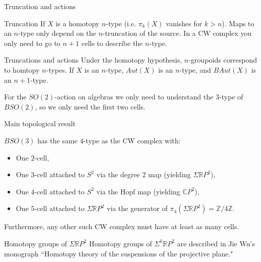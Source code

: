 \documentclass[beamer]{beamer}
\begin{document}
\begin{frame}{Truncation and actions}
\begin{block}{Truncation}
If $X$ is a homotopy $n$-type (i.e. $\pi_k(X)$ vanishes for $k > n$).  Maps to an $n$-type only depend on the $n$-truncation of the source.  In a CW complex you only need to go to $n+1$ cells to describe the $n$-type.
\end{block}

\begin{block}{Truncations and actions}
Under the homotopy hypothesis, $n$-groupoids correspond to homtopy $n$-types.  If $X$ is an $n$-type,  $Aut(X)$ is an $n$-type, and $BAut(X)$ is an $n+1$-type.  
\end{block}

\begin{example}
For the $SO(2)$-action on algebras we only need to understand the $3$-type of $BSO(2)$, so we only need the first two cells.
\end{example}

\end{frame}

\begin{frame}{Main topological result}
\begin{theorem}[DSPS]
$BSO(3)$ has the same $4$-type as the CW complex with:
\begin{itemize}
\item One $2$-cell,
\item One $3$-cell attached to $S^2$ via the degree $2$ map (yielding $\Sigma \mathbb{R}P^2$),
\item One $4$-cell attached to $S^2$ via the Hopf map (yielding $\mathbb{C}P^2$),
\item One $5$-cell attached to $\Sigma \mathbb{R}P^2$ via the generator of $\pi_4(\Sigma \mathbb{R}P^2) = \mathbb{Z}/4\mathbb{Z}$.
\end{itemize}
Furthermore, any other such CW complex must have at least as many cells.
\end{theorem}

\begin{block}{Homotopy groups of $\Sigma \mathbb{R}P^2$}
Homotopy groups of $\Sigma^k \mathbb{R}P^2$ are described in Jie Wu's monograph ``Homotopy theory of the suspensions of the projective plane."
\end{block}
\end{frame}
\end{document}
